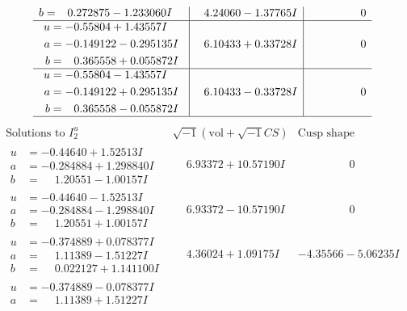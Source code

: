 \documentclass[1p]{elsarticle_modified}
\theoremstyle{definition}
\newcommand{\I}{\sqrt{-1}}
\begin{document}
$$\begin{array}{c|c|c}
\begin{aligned}
b &= \phantom{-}0.272875 - 1.233060 I\end{aligned}
 & \phantom{-}4.24060 - 1.37765 I & \phantom{-0.000000 } 0 \\ \hline\begin{aligned}
u &= -0.55804 + 1.43557 I \\
a &= -0.149122 - 0.295135 I \\
b &= \phantom{-}0.365558 + 0.055872 I\end{aligned}
 & \phantom{-}6.10433 + 0.33728 I & \phantom{-0.000000 } 0 \\ \hline\begin{aligned}
u &= -0.55804 - 1.43557 I \\
a &= -0.149122 + 0.295135 I \\
b &= \phantom{-}0.365558 - 0.055872 I\end{aligned}
 & \phantom{-}6.10433 - 0.33728 I & \phantom{-0.000000 } 0\\
 \hline 
 \end{array}$$\newpage$$\begin{array}{c|c|c}  
\text{Solutions to }I^u_{2}& \I (\text{vol} + \sqrt{-1}CS) & \text{Cusp shape}\\
 \hline 
\begin{aligned}
u &= -0.44640 + 1.52513 I \\
a &= -0.284884 + 1.298840 I \\
b &= \phantom{-}1.20551 - 1.00157 I\end{aligned}
 & \phantom{-}6.93372 + 10.57190 I & \phantom{-0.000000 } 0 \\ \hline\begin{aligned}
u &= -0.44640 - 1.52513 I \\
a &= -0.284884 - 1.298840 I \\
b &= \phantom{-}1.20551 + 1.00157 I\end{aligned}
 & \phantom{-}6.93372 - 10.57190 I & \phantom{-0.000000 } 0 \\ \hline\begin{aligned}
u &= -0.374889 + 0.078377 I \\
a &= \phantom{-}1.11389 - 1.51227 I \\
b &= \phantom{-}0.022127 + 1.141100 I\end{aligned}
 & \phantom{-}4.36024 + 1.09175 I & -4.35566 - 5.06235 I \\ \hline\begin{aligned}
u &= -0.374889 - 0.078377 I \\
a &= \phantom{-}1.11389 + 1.51227 I \\

\end{aligned}
\end{array}$$
\end{document}
